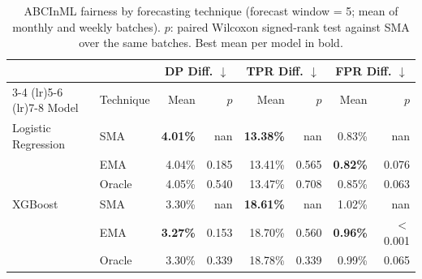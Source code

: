 \begin{table}
  \small
  \caption{ABCInML fairness by forecasting technique (forecast window = 5; mean of monthly and weekly batches). $p$: paired Wilcoxon signed-rank test against SMA over the same batches. Best mean per model in bold.}
  \label{tab:forecasting-fairness}
  \begin{tabular}{llrrrrrr}
    \toprule
     & & \multicolumn{2}{c}{DP Diff. $\downarrow$} & \multicolumn{2}{c}{TPR Diff. $\downarrow$} & \multicolumn{2}{c}{FPR Diff. $\downarrow$} \\
    \cmidrule(lr){3-4} \cmidrule(lr){5-6} \cmidrule(lr){7-8}
    Model & Technique & Mean & $p$ & Mean & $p$ & Mean & $p$ \\
    \midrule
    Logistic Regression & SMA & \textbf{4.01\%} & nan & \textbf{13.38\%} & nan & 0.83\% & nan \\
     & EMA & 4.04\% & 0.185 & 13.41\% & 0.565 & \textbf{0.82\%} & 0.076 \\
     & Oracle & 4.05\% & 0.540 & 13.47\% & 0.708 & 0.85\% & 0.063 \\
    \midrule
    XGBoost & SMA & 3.30\% & nan & \textbf{18.61\%} & nan & 1.02\% & nan \\
     & EMA & \textbf{3.27\%} & 0.153 & 18.70\% & 0.560 & \textbf{0.96\%} & $<$0.001 \\
     & Oracle & 3.30\% & 0.339 & 18.78\% & 0.339 & 0.99\% & 0.065 \\
    \bottomrule
  \end{tabular}
\end{table}

